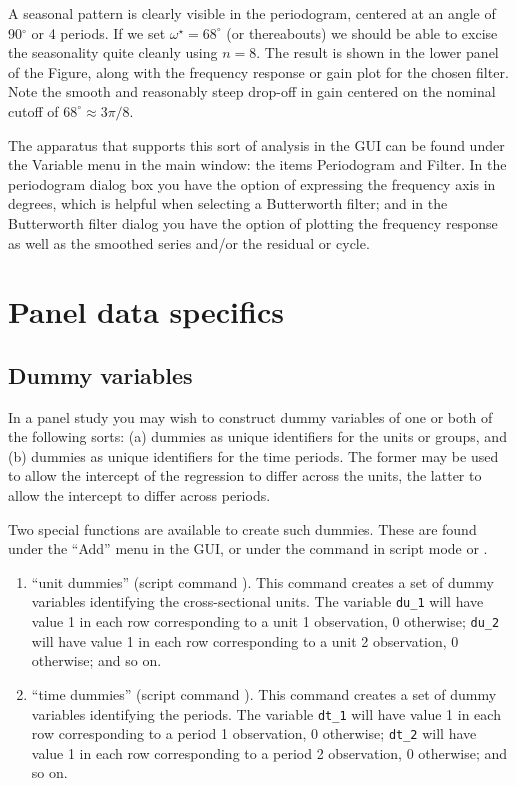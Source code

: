 A seasonal pattern is clearly visible in the periodogram, centered at
an angle of 90$^{\circ}$ or 4 periods. If we set $\omega^{\star} =
68^{\circ}$ (or thereabouts) we should be able to excise the
seasonality quite cleanly using $n=8$.  The result is shown in the
lower panel of the Figure, along with the frequency response or gain
plot for the chosen filter. Note the smooth and reasonably steep
drop-off in gain centered on the nominal cutoff of $68^{\circ} \approx
3\pi/8$.

The apparatus that supports this sort of analysis in the 
GUI can be found under the \textsf{Variable} menu in the main window:
the items \textsf{Periodogram} and \textsf{Filter}. In the periodogram
dialog box you have the option of expressing the frequency axis in
degrees, which is helpful when selecting a Butterworth filter; and in
the Butterworth filter dialog you have the option of plotting the
frequency response as well as the smoothed series and/or the residual
or cycle.

     
\section{Panel data specifics}
\label{panel-genr}

\subsection{Dummy variables}
\label{dummies}

In a panel study you may wish to construct dummy variables of one or
both of the following sorts: (a) dummies as unique identifiers for the
units or groups, and (b) dummies as unique identifiers for the time
periods.  The former may be used to allow the intercept of the
regression to differ across the units, the latter to allow the
intercept to differ across periods.

Two special functions are available to create such dummies.  These are
found under the ``Add'' menu in the GUI, or under the 
command in script mode or .

\begin{enumerate}
\item ``unit dummies'' (script command ).  This
  command creates a set of dummy variables identifying the
  cross-sectional units.  The variable \verb+du_1+ will have value 1
  in each row corresponding to a unit 1 observation, 0 otherwise;
  \verb+du_2+ will have value 1 in each row corresponding to a unit 2
  observation, 0 otherwise; and so on.
\item ``time dummies'' (script command ).  This
  command creates a set of dummy variables identifying the periods.
  The variable \verb+dt_1+ will have value 1 in each row
  corresponding to a period 1 observation, 0 otherwise; \verb+dt_2+
  will have value 1 in each row corresponding to a period 2
  observation, 0 otherwise; and so on.
\end{enumerate}

